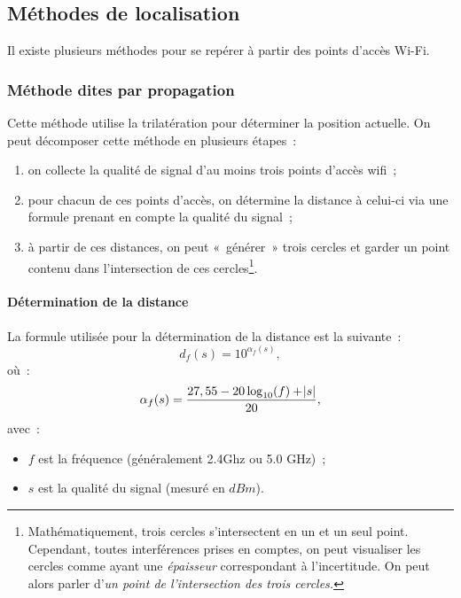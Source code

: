 \documentclass[11pt,a4paper]{article}
\begin{document}
  \subsection{Méthodes de localisation}
  Il existe plusieurs méthodes pour se repérer à partir des points d'accès Wi-Fi.

  \subsubsection{Méthode dites par propagation}
    Cette méthode utilise la trilatération pour déterminer la position actuelle. On peut décomposer cette méthode en plusieurs étapes~:
    \begin{enumerate}
      \item on collecte la qualité de signal d'au moins trois points d'accès wifi~;
      \item pour chacun de ces points d'accès, on détermine la distance à celui-ci via une formule prenant en compte la qualité du signal~;
      \item à partir de ces distances, on peut «~générer~» trois cercles et garder un point contenu dans l'intersection de ces cercles\footnote{Mathématiquement, trois cercles s'intersectent en un et un seul point. Cependant, toutes interférences prises en comptes, on peut visualiser les cercles comme ayant une \textit{épaisseur} correspondant à l'incertitude. On peut alors parler d'\textit{un point de l'intersection des trois cercles.}}.
    \end{enumerate}

    \paragraph{Détermination de la distance}
      La formule utilisée pour la détermination de la distance est la suivante~:
      \[d_f(s) = 10^{\alpha_f(s)},\]
	  où~:
	  \[\alpha_f(s) = \frac{27,55-20\log_{10}(f)+\abs s}{20},\]
      avec~:
	  \begin{itemize}
        \item[] $f$ est la fréquence (généralement 2.4Ghz ou 5.0 GHz)~;
        \item[] $s$ est la qualité du signal (mesuré en $dBm$).
      \end{itemize}
\end{document}
